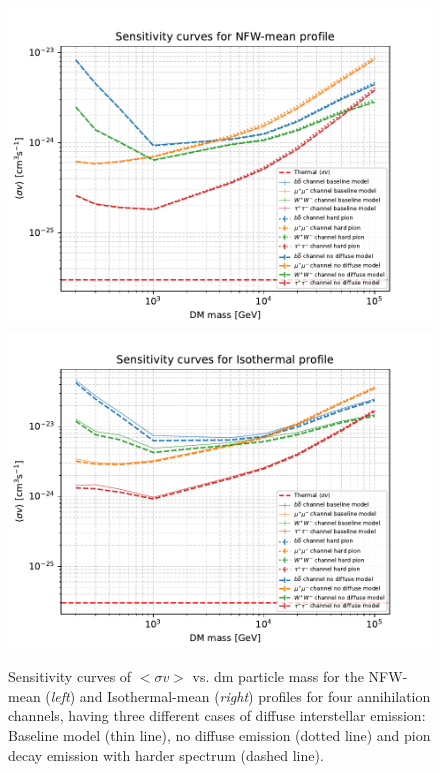 \documentclass[main.tex]{subfiles}
\begin{document}
\begin{figure}[h]
  \centering
  \includegraphics[width=1\textwidth]{Pictures/Limits_NFW-mean_comparediff.pdf}
  \endminipage
  \includegraphics[width=1\textwidth]{Pictures/Limits_Isothermal_comparediff.pdf}
  \endminipage
  \caption{Sensitivity curves of $<\sigma v >$ vs. \gls{dm} particle mass for the NFW-mean (\textit{left}) and Isothermal-mean (\textit{right}) profiles for four annihilation channels, having three different cases of diffuse interstellar emission: Baseline model (thin line), no diffuse emission (dotted line) and pion decay emission with harder spectrum (dashed line).}
  \label{fig:dmsensi_diff}
  \end{figure}
\end{document}
